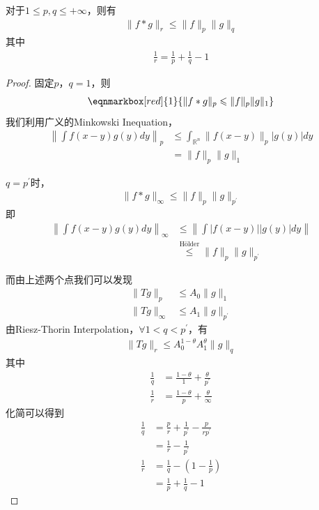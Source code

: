 \begin{theorem}
    对于$1\leqslant p,q\leqslant +\infty$，则有
    \begin{align*}
        \|f * g\|_r \leqslant \|f\|_p \|g\|_q
    \end{align*}
    其中
    \begin{align*}
        \frac{1}{r} = \frac{1}{p} + \frac{1}{q} - 1
    \end{align*}
\end{theorem}
\begin{proof}
    固定$p$，$q=1$，则
    \begin{align*}
        \eqnmarkbox[red]{1}{\|f * g\|_p \leqslant \|f\|_p \|g\|_1}
    \end{align*}
    我们利用广义的Minkowski Inequation，
    \begin{align*}
        \left\| \int f(x-y) g(y) dy \right\|_p &\leqslant \int_{\mathbb{R}^n} \| f(x-y)\|_p |g(y)| dy \\
        &= \|f\|_p \|g\|_1
    \end{align*}

    $q = p^{\prime}$时，
    \begin{align*}
        \|f * g\|_{\infty} \leqslant \|f\|_p \|g\|_{p^{\prime}} 
    \end{align*}
    即
    \begin{align*}
        \left\| \int f(x-y) g(y) dy \right\|_{\infty} & \leqslant \left\|\int |f(x-y)| |g(y)| dy \right\| \\
        & \overset{\text{Hölder}}{\leqslant} \|f\|_p \|g\|_{p^{\prime}}
    \end{align*}

    而由上述两个点我们可以发现
    \begin{align*}
        \|T g \|_p & \leqslant A_0 \|g\|_1 \\
        \|T g\|_{\infty} &\leqslant A_1 \|g\|_{p^{\prime}}
    \end{align*}
    由Riesz-Thorin Interpolation，$\forall 1< q<p^{\prime}$，有
    \begin{align*}
        \|Tg\|_r \leqslant A_0^{1-\theta} A_1^{\theta} \|g\|_q
    \end{align*}
    其中
    \begin{align*}
        \frac{1}{q} &= \frac{1-\theta}{1} + \frac{\theta}{p^{\prime}} \\
        \frac{1}{r} &= \frac{1-\theta}{p} + \frac{\theta}{\infty}
    \end{align*}
    化简可以得到
    \begin{align*}
        \frac{1}{q} &= \frac{p}{r} + \frac{1}{p^{\prime}} - \frac{p}{rp^{\prime}} \\
        &= \frac{1}{r} - \frac{1}{p^{\prime}} \\
        \frac{1}{r} &= \frac{1}{q} - (1 - \frac{1}{p}) \\
        & = \frac{1}{p} + \frac{1}{q} - 1
    \end{align*}
\end{proof}

